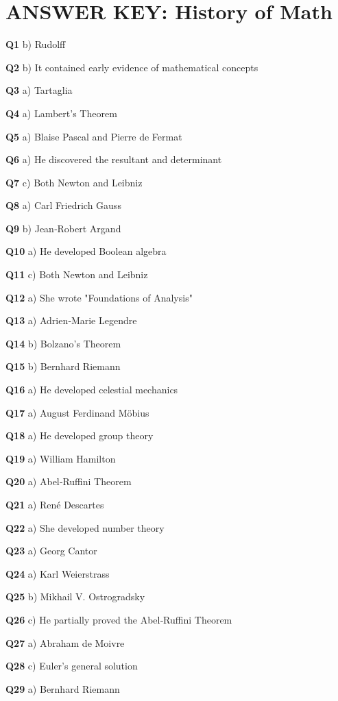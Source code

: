 \section{ANSWER KEY: History of Math}

\textbf{Q1} b) Rudolff\par
\textbf{Q2} b) It contained early evidence of mathematical concepts\par
\textbf{Q3} a) Tartaglia\par
\textbf{Q4} a) Lambert's Theorem\par
\textbf{Q5} a) Blaise Pascal and Pierre de Fermat\par
\textbf{Q6} a) He discovered the resultant and determinant\par
\textbf{Q7} c) Both Newton and Leibniz\par
\textbf{Q8} a) Carl Friedrich Gauss\par
\textbf{Q9} b) Jean‑Robert Argand\par
\textbf{Q10} a) He developed Boolean algebra\par
\textbf{Q11} c) Both Newton and Leibniz\par
\textbf{Q12} a) She wrote "Foundations of Analysis"\par
\textbf{Q13} a) Adrien‑Marie Legendre\par
\textbf{Q14} b) Bolzano's Theorem\par
\textbf{Q15} b) Bernhard Riemann\par
\textbf{Q16} a) He developed celestial mechanics\par
\textbf{Q17} a) August Ferdinand Möbius\par
\textbf{Q18} a) He developed group theory\par
\textbf{Q19} a) William Hamilton\par
\textbf{Q20} a) Abel‑Ruffini Theorem\par
\textbf{Q21} a) René Descartes\par
\textbf{Q22} a) She developed number theory\par
\textbf{Q23} a) Georg Cantor\par
\textbf{Q24} a) Karl Weierstrass\par
\textbf{Q25} b) Mikhail V. Ostrogradsky\par
\textbf{Q26} c) He partially proved the Abel‑Ruffini Theorem\par
\textbf{Q27} a) Abraham de Moivre\par
\textbf{Q28} c) Euler's general solution\par
\textbf{Q29} a) Bernhard Riemann\par
